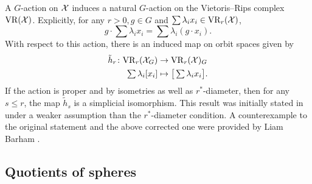 A \(G\)-action on $\mathcal{X}$ induces a natural \(G\)-action on the Vietoris--Rips complex $\mathrm{VR}(\mathcal{X})$.
Explicitly, for any \(r > 0, g\in G\) and $\sum \lambda_i x_i \in \mathrm{VR}_r(\mathcal{X})$,
\[
g \cdot \sum \lambda_i x_i = \sum \lambda_i (g\cdot x_i).
\]
With respect to this action, there is an induced map on orbit spaces given by
\begin{align*}
	\tilde h_r \colon \mathrm{VR}_r(\mathcal{X}_G) &\to \mathrm{VR}_r(\mathcal{X})_G \\
	\textstyle\sum\lambda_i [x_i] &\mapsto \textstyle \big[\sum\lambda_i x_i\big].
\end{align*}
If the action is proper and by isometries as well as \(r^*\)-diameter, then for any \(s \leq r\), the map $\tilde{h}_s$ is a simplicial isomorphism.
This result was initially stated in \cite[Prop.~3.5]{adams2022metric} under a weaker assumption than the \(r^*\)-diameter condition.
A counterexample to the original statement and the above corrected one were provided by Liam Barham \cite{bibid}.




\subsection{Quotients of spheres}

\subsubsection{}

